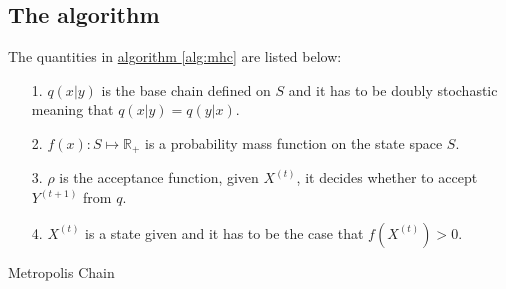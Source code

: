 \documentclass[]{article}
\theoremstyle{definition}
\begin{document}
    \subsection{The algorithm}
        The quantities in \hyperref[alg:mhc]{algorithm \ref*{alg:mhc}} are listed below: 
        \begin{itemize}
            \item [1.] $q(x|y)$ is the base chain defined on $S$ and it has to be doubly stochastic meaning that $q(x|y) = q(y|x)$. 
            \item [2.] $f(x): S \mapsto \mathbb R_+$ is a probability mass function on the state space $S$.
            \item [3.] $\rho$ is the acceptance function, given $X^{(t)}$, it decides whether to accept $Y^{(t + 1)}$ from $q$. 
            \item [4.] $X^{(t)}$ is a state given and it has to be the case that $f(X^{(t)}) > 0$. 
        \end{itemize}
        \begin{algorithm}
            \begin{algorithmic}[H]
            \end{algorithmic}
            \caption{Metropolis Chain}
            \label{alg:mhc}
        \end{algorithm}
    
\end{document}
